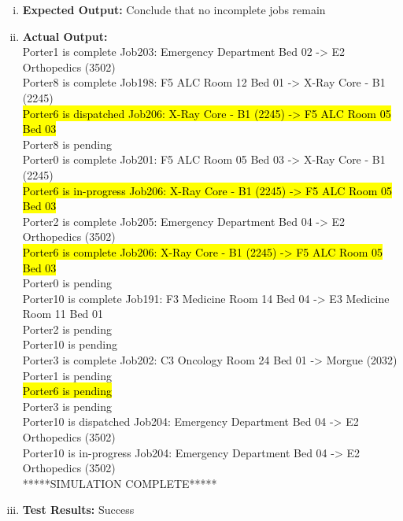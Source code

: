 \documentclass[paper=letter, fontsize=10pt]{scrartcl}
\numberwithin{equation}{section}		%
\numberwithin{figure}{section}			%
\numberwithin{table}{section}				%
\begin{document}
\begin{enumerate}[(i)]
\begin{table}
\begin{center}
\begin{tabular}{| c | l | l | l | l |}
    	\end{tabular}
	\end{center}
	\end{table}
	\item \textbf{Expected Output:} Conclude that no incomplete jobs remain
	\item \textbf{Actual Output:} \\
Porter1 is complete Job203: Emergency Department Bed 02 -> E2 Orthopedics (3502)\\
Porter8 is complete Job198: F5 ALC Room 12 Bed 01 -> X-Ray Core - B1 (2245)\\
\hl{Porter6 is dispatched Job206: X-Ray Core - B1 (2245) -> F5 ALC Room 05 Bed 03}\\
Porter8 is pending\\
Porter0 is complete Job201: F5 ALC Room 05 Bed 03 -> X-Ray Core - B1 (2245)\\
\hl{Porter6 is in-progress Job206: X-Ray Core - B1 (2245) -> F5 ALC Room 05 Bed 03}\\
Porter2 is complete Job205: Emergency Department Bed 04 -> E2 Orthopedics (3502)\\
\hl{Porter6 is complete Job206: X-Ray Core - B1 (2245) -> F5 ALC Room 05 Bed 03}\\
Porter0 is pending\\
Porter10 is complete Job191: F3 Medicine Room 14 Bed 04 -> E3 Medicine Room 11 Bed 01\\
Porter2 is pending\\
Porter10 is pending\\
Porter3 is complete Job202: C3 Oncology Room 24 Bed 01 -> Morgue (2032)\\
Porter1 is pending\\
\hl{Porter6 is pending}\\
Porter3 is pending\\
Porter10 is dispatched Job204: Emergency Department Bed 04 -> E2 Orthopedics (3502)\\
Porter10 is in-progress Job204: Emergency Department Bed 04 -> E2 Orthopedics (3502)\\
*****SIMULATION COMPLETE*****
	\item \textbf{Test Results:} Success
\end{enumerate}
\end{document}
